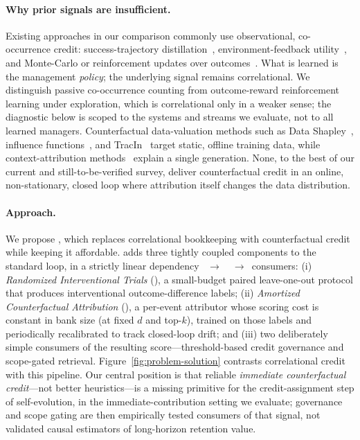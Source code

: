 \paragraph{Why prior signals are insufficient.}
Existing approaches in our comparison commonly use observational, co-occurrence
credit: success-trajectory distillation~, environment-feedback
utility~, and Monte-Carlo or reinforcement updates over
outcomes~. What is learned is the management \emph{policy};
the underlying signal remains correlational. We distinguish passive co-occurrence
counting from outcome-reward reinforcement learning under exploration, which is
correlational only in a weaker sense; the diagnostic below is scoped to the systems
and streams we evaluate, not to all learned managers. Counterfactual data-valuation
methods such as Data Shapley~, influence
functions~, and TracIn~
target static, offline training data, while context-attribution
methods~ explain a single generation. None, to the best
of our current and still-to-be-verified survey, deliver counterfactual credit in
an online, non-stationary, closed loop where attribution itself changes the data
distribution.

\paragraph{Approach.}
We propose \method{}, which replaces correlational bookkeeping with counterfactual
credit while keeping it affordable. \method{} adds three tightly coupled
components to the standard loop, in a strictly linear dependency
\rit{}~$\rightarrow$~\aca{}~$\rightarrow$~consumers: (i) \emph{Randomized
Interventional Trials} (\rit{}), a small-budget paired leave-one-out protocol that
produces interventional outcome-difference labels; (ii) \emph{Amortized Counterfactual Attribution} (\aca{}),
a per-event attributor whose scoring cost is constant in bank size (at fixed $d$
and top-$k$), trained on those labels and periodically
recalibrated to track closed-loop drift; and (iii) two deliberately simple
consumers of the resulting score---threshold-based credit governance and
scope-gated retrieval. Figure~\ref{fig:problem-solution} contrasts correlational
credit with this pipeline. Our central position is that reliable \emph{immediate
counterfactual credit}---not better heuristics---is a missing primitive for the
credit-assignment step of self-evolution, in the immediate-contribution setting we
evaluate; governance and scope gating are then empirically tested consumers of that
signal, not validated causal estimators of long-horizon retention value.

